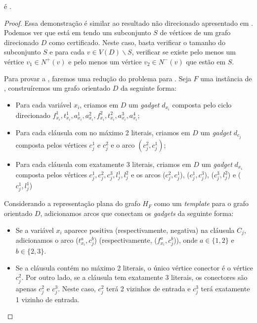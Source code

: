 \begin{theorem}
    \ind é \npc.
\begin{proof}
    Essa demonstração é similar ao resultado não direcionado apresentado em \cite{PENSO201583}. Podemos ver que \ind está em \np tendo um subconjunto $S$ de vértices de um grafo direcionado $D$ como certificado. Neste caso, basta verificar o tamanho do subconjunto $S$ e para cada $v \in V(D) \backslash S$, verificar se existe pelo menos um vértice $v_1 \in N^+(v)$ e pelo menos um vértice $v_2 \in N^-(v)$ que estão em $S$.

    Para provar a \npct, faremos uma redução do problema \sam para \ind. Seja $F$ uma instância de \sam, construíremos um grafo orientado $D$ da seguinte forma:

    \begin{itemize}
        \item Para cada variável $x_i$, criamos em $D$ um \emph{gadget} $d_{x_i}$ composta pelo ciclo direcionado $f^1_{x_i}, t^1_{x_i}, a^1_{x_i}, a^2_{x_i},f^2_{x_i}, t^2_{x_i}, a^3_{x_i}, a^4_{x_i}$;

        \item Para cada cláusula com no máximo 2 literais, criamos em $D$ um \emph{gadget} $d_{c_j}$ composta pelos vértices $c^1_j$ e $c^2_j$ e o arco $(c^2_j, c^1_j)$;
        
        \item Para cada cláusula com exatamente 3 literais, criamos em $D$ um \emph{gadget} $d_{x_i}$ composta pelos vértices $c^1_j, c^2_j, c^3_j, l^1_j, l^2_j$ e os arcos ($c^2_j, c^1_j$), ($c^1_j, c^3_j$), ($c^3_j, l^2_j$) e ($c^1_j, l^1_j$)

    \end{itemize}

    Considerando a representação plana do grafo $H_F$ como um \emph{template} para o grafo orientado $D$, adicionamos arcos que conectam os \emph{gadgets} da seguinte forma: 

    \begin{itemize}
        \item Se a variável $x_i$ aparece positiva (respectivamente, negativa) na cláusula $C_j$, adicionamos o arco ($t^a_{x_i}, c^b_j$) (respectivamente, ($f^a_{x_i}, c^b_j$)), onde $a \in \{1,2\}$ e $b \in \{2,3\}$.
        \item Se a cláusula contém no máximo 2 literais, o único vértice conector é o vértice $c^2_j$. Por outro lado, se a cláusula tem exatamente 3 literais, os conectores são apenas $c^2_j$ e $c^3_j$. Neste caso, $c^2_j$ terá 2 vizinhos de entrada e $c^3_j$ terá exatamente 1 vizinho de entrada.
        

\end{itemize}
\end{proof}
\end{theorem}
